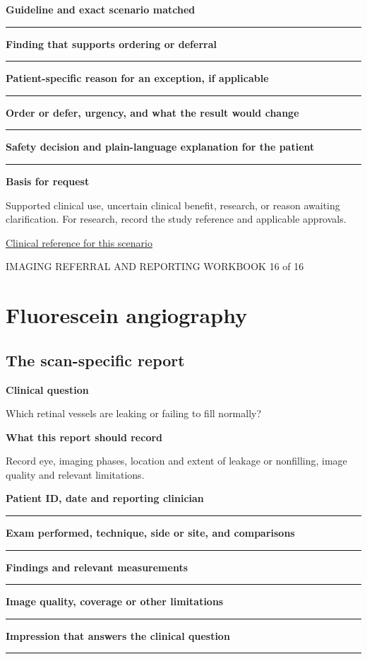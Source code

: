 \documentclass[11pt,a4paper]{article}
\newcommand{\record}[1]{\textbf{#1}\par\vspace{0.55\baselineskip}\hrule\vspace{0.35\baselineskip}}
\begin{document}
\record{Guideline and exact scenario matched}

\record{Finding that supports ordering or deferral}

\record{Patient-specific reason for an exception, if applicable}

\record{Order or defer, urgency, and what the result would change}

\record{Safety decision and plain-language explanation for the patient}

\textbf{Basis for request}\par Supported clinical use, uncertain clinical benefit, research, or reason awaiting clarification. For research, record the study reference and applicable approvals.\par

\small\href{https://www.aaojournal.org/article/S0161-6420(19)32902-5/fulltext/}{Clinical reference for this scenario}

\normalsize

\newpage

{\small IMAGING REFERRAL AND REPORTING WORKBOOK \hfill 16 of 16}

\section*{Fluorescein angiography}

\subsection*{The scan-specific report}

\textbf{Clinical question}\par Which retinal vessels are leaking or failing to fill normally?\par

\textbf{What this report should record}\par Record eye, imaging phases, location and extent of leakage or nonfilling, image quality and relevant limitations.\par

\record{Patient ID, date and reporting clinician}

\record{Exam performed, technique, side or site, and comparisons}

\record{Findings and relevant measurements}

\record{Image quality, coverage or other limitations}

\record{Impression that answers the clinical question}
\end{document}
